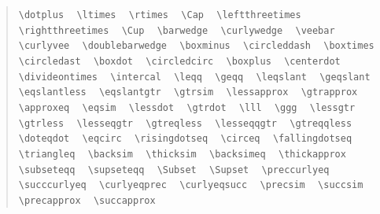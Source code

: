 \documentclass{article}
\newcommand{\texcommand}[1]{\textbackslash{}#1}
\newcommand{\spacer}{\,\,\, \hfil}
\newenvironment{mylist}{\begin{quote}}{\end{quote}}
\begin{document}
\begin{mylist}
\texttt{\texcommand{dotplus}} \spacer 
\texttt{\texcommand{ltimes}} \spacer 
\texttt{\texcommand{rtimes}} \spacer 
\texttt{\texcommand{Cap}} \spacer 
\texttt{\texcommand{leftthreetimes}} \spacer 
\texttt{\texcommand{rightthreetimes}} \spacer 
\texttt{\texcommand{Cup}} \spacer 
\texttt{\texcommand{barwedge}} \spacer 
\texttt{\texcommand{curlywedge}} \spacer 
\texttt{\texcommand{veebar}} \spacer 
\texttt{\texcommand{curlyvee}} \spacer 
\texttt{\texcommand{doublebarwedge}} \spacer 
\texttt{\texcommand{boxminus}} \spacer 
\texttt{\texcommand{circleddash}} \spacer 
\texttt{\texcommand{boxtimes}} \spacer 
\texttt{\texcommand{circledast}} \spacer 
\texttt{\texcommand{boxdot}} \spacer 
\texttt{\texcommand{circledcirc}} \spacer 
\texttt{\texcommand{boxplus}} \spacer 
\texttt{\texcommand{centerdot}} \spacer 
\texttt{\texcommand{divideontimes}} \spacer 
\texttt{\texcommand{intercal}} \spacer 
\texttt{\texcommand{leqq}} \spacer 
\texttt{\texcommand{geqq}} \spacer 
\texttt{\texcommand{leqslant}} \spacer 
\texttt{\texcommand{geqslant}} \spacer 
\texttt{\texcommand{eqslantless}} \spacer 
\texttt{\texcommand{eqslantgtr}} \spacer 
\texttt{\texcommand{gtrsim}} \spacer 
\texttt{\texcommand{lessapprox}} \spacer 
\texttt{\texcommand{gtrapprox}} \spacer 
\texttt{\texcommand{approxeq}} \spacer 
\texttt{\texcommand{eqsim}} \spacer 
\texttt{\texcommand{lessdot}} \spacer 
\texttt{\texcommand{gtrdot}} \spacer 
\texttt{\texcommand{lll}} \spacer 
\texttt{\texcommand{ggg}} \spacer 
\texttt{\texcommand{lessgtr}} \spacer 
\texttt{\texcommand{gtrless}} \spacer 
\texttt{\texcommand{lesseqgtr}} \spacer 
\texttt{\texcommand{gtreqless}} \spacer 
\texttt{\texcommand{lesseqqgtr}} \spacer 
\texttt{\texcommand{gtreqqless}} \spacer 
\texttt{\texcommand{doteqdot}} \spacer 
\texttt{\texcommand{eqcirc}} \spacer 
\texttt{\texcommand{risingdotseq}} \spacer 
\texttt{\texcommand{circeq}} \spacer 
\texttt{\texcommand{fallingdotseq}} \spacer 
\texttt{\texcommand{triangleq}} \spacer 
\texttt{\texcommand{backsim}} \spacer 
\texttt{\texcommand{thicksim}} \spacer 
\texttt{\texcommand{backsimeq}} \spacer 
\texttt{\texcommand{thickapprox}} \spacer 
\texttt{\texcommand{subseteqq}} \spacer 
\texttt{\texcommand{supseteqq}} \spacer 
\texttt{\texcommand{Subset}} \spacer 
\texttt{\texcommand{Supset}} \spacer 
\texttt{\texcommand{preccurlyeq}} \spacer 
\texttt{\texcommand{succcurlyeq}} \spacer 
\texttt{\texcommand{curlyeqprec}} \spacer 
\texttt{\texcommand{curlyeqsucc}} \spacer 
\texttt{\texcommand{precsim}} \spacer 
\texttt{\texcommand{succsim}} \spacer 
\texttt{\texcommand{precapprox}} \spacer 
\texttt{\texcommand{succapprox}} \spacer 

\end{mylist}
\end{document}
